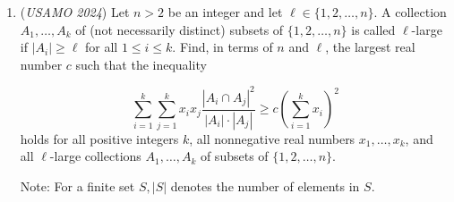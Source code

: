 \begin{enumerate}
 

	\item (\textit{USAMO 2024}) Let $n>2$ be an integer and let $\ell \in\{1,2, \ldots, n\}$. A collection $A_1, \ldots, A_k$ of (not necessarily distinct) subsets of $\{1,2, \ldots, n\}$ is called $\ell$-large if $\left|A_i\right| \geq \ell$ for all $1 \leq i \leq k$. Find, in terms of $n$ and $\ell$, the largest real number $c$ such that the inequality

 \[\sum_{i=1}^k \sum_{j=1}^k x_i x_j \frac{\left|A_i \cap A_j\right|^2}{\left|A_i\right| \cdot\left|A_j\right|} \geq c\left(\sum_{i=1}^k x_i\right)^2\]
holds for all positive integers $k$, all nonnegative real numbers $x_1, \ldots, x_k$, and all $\ell$-large collections $A_1, \ldots, A_k$ of subsets of $\{1,2, \ldots, n\}$.


 Note: For a finite set $S,|S|$ denotes the number of elements in $S$.


 

\end{enumerate}
